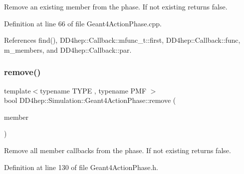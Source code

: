 Remove an existing member from the phase. If not existing returns false. 



Definition at line 66 of file Geant4\+Action\+Phase.\+cpp.



References find(), D\+D4hep\+::\+Callback\+::mfunc\+\_\+t\+::first, D\+D4hep\+::\+Callback\+::func, m\+\_\+members, and D\+D4hep\+::\+Callback\+::par.

\hypertarget{class_d_d4hep_1_1_simulation_1_1_geant4_action_phase_ae0e3c1feb01b893930ac86603f3b08de}{}\label{class_d_d4hep_1_1_simulation_1_1_geant4_action_phase_ae0e3c1feb01b893930ac86603f3b08de} 
\subsubsection{\texorpdfstring{remove()}{remove()}\hspace{0.1cm}{\footnotesize\ttfamily [2/3]}}
{\footnotesize\ttfamily template$<$typename T\+Y\+PE , typename P\+MF $>$ \\
bool D\+D4hep\+::\+Simulation\+::\+Geant4\+Action\+Phase\+::remove (\begin{DoxyParamCaption}\item[{T\+Y\+PE $\ast$}]{member }\end{DoxyParamCaption})\hspace{0.3cm}{\ttfamily [inline]}}



Remove all member callbacks from the phase. If not existing returns false. 



Definition at line 130 of file Geant4\+Action\+Phase.\+h.

\hypertarget{class_d_d4hep_1_1_simulation_1_1_geant4_action_phase_a286f026ed98f51673c3570d54e215105}{}\label{class_d_d4hep_1_1_simulation_1_1_geant4_action_phase_a286f026ed98f51673c3570d54e215105} 
